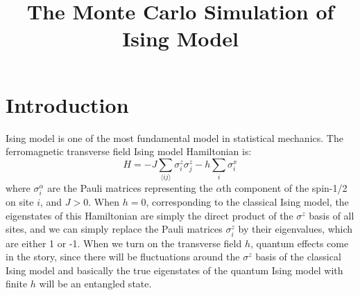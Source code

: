 \documentclass{article}
\title{The Monte Carlo Simulation of Ising Model}
\author{}
\date{}
\theoremstyle{plain} \newtheorem{thm}{Theorem}[section]
\theoremstyle{definition} \newtheorem{df}{Definition}[section]
\theoremstyle{definition} \newtheorem{eg}{Example}
\theoremstyle{remark} \newtheorem*{rmk}{Remark}
\begin{document}
\maketitle


\section{Introduction}
Ising model is one of the most fundamental model in statistical mechanics. The ferromagnetic transverse field Ising model Hamiltonian is:
\begin{equation}
	H=-J\sum_{\langle ij\rangle}\sigma^z_i\sigma^z_j-h\sum_i\sigma_i^x
\end{equation}
where $\sigma_i^\alpha$ are the Pauli matrices representing the $\alpha$th component of the spin-1/2 on site $i$, and $J>0$. When $h=0$, corresponding to the classical Ising model, the eigenstates of this Hamiltonian are simply the direct product of the $\sigma^z$ basis of all sites, and we can simply replace the Pauli matrices $\sigma_i^z$ by their eigenvalues, which are either 1 or -1. When we turn on the transverse field $h$, quantum effects come in the story, since there will be fluctuations around the $\sigma^z$ basis of the classical Ising model and basically the true eigenstates of the quantum Ising model with finite $h$ will be an entangled state. 
\end{document}
